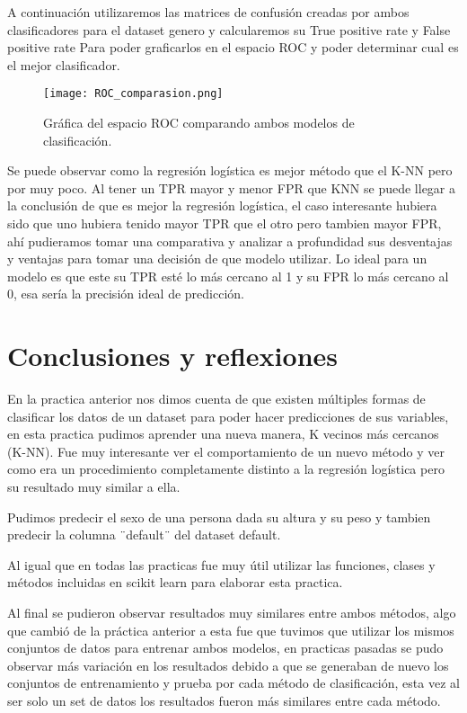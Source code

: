 \documentclass[sigconf,authorversion,nonacm]{acmart}
\begin{document}
A continuación utilizaremos las matrices de confusión creadas por ambos clasificadores para el dataset genero y calcularemos su True positive rate y False positive rate Para poder graficarlos en el espacio ROC y poder determinar cual es el mejor clasificador.

\begin{figure}[H]
  \centering
  \texttt{[image: ROC\_comparasion.png]}
  \caption{Gráfica del espacio ROC comparando ambos modelos de clasificación.}
\end{figure}

Se puede observar como la regresión logística es mejor método que el K-NN pero por muy poco. Al tener un TPR mayor y menor FPR que KNN se puede llegar a la conclusión de que es mejor la regresión logística, el caso interesante hubiera sido que uno hubiera tenido mayor TPR que el otro pero tambien mayor FPR, ahí pudieramos tomar una comparativa y analizar a profundidad sus desventajas y ventajas para tomar una decisión de que modelo utilizar.
Lo ideal para un modelo es que este su TPR esté lo más cercano al 1 y su FPR lo más cercano al 0, esa sería la precisión ideal de predicción.

\section{Conclusiones y reflexiones}
En la practica anterior nos dimos cuenta de que existen múltiples formas de clasificar los datos de un dataset para poder hacer predicciones de sus variables, en esta practica pudimos aprender una nueva manera, K vecinos más cercanos (K-NN). Fue muy interesante ver el comportamiento de un nuevo método y ver como era un procedimiento completamente distinto a la regresión logística pero su resultado muy similar a ella.

Pudimos predecir el sexo de una persona dada su altura y su peso y tambien predecir la columna ¨default¨ del dataset default.

Al igual que en todas las practicas fue muy útil utilizar las funciones, clases y métodos incluidas en scikit learn para elaborar esta practica.


Al final se pudieron observar resultados muy similares entre ambos métodos, algo que cambió de la práctica anterior a esta fue que tuvimos que utilizar los mismos conjuntos de datos para entrenar ambos modelos, en practicas pasadas se pudo observar más variación en los resultados debido a que se generaban de nuevo los conjuntos de entrenamiento y prueba por cada método de clasificación, esta vez al ser solo un set de datos los resultados fueron más similares entre cada método.
\end{document}
